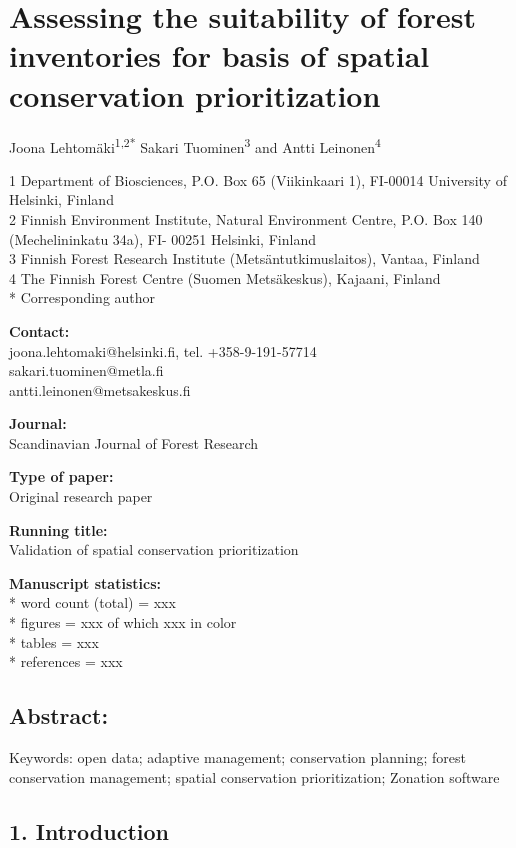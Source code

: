 \documentclass[]{article}
\begin{document}
\section{Assessing the suitability of forest inventories for basis of
spatial conservation prioritization}

Joona Lehtomäki\textsuperscript{1,2*} Sakari Tuominen\textsuperscript{3}
and Antti Leinonen\textsuperscript{4}

1 Department of Biosciences, P.O. Box 65 (Viikinkaari 1), FI-00014
University of Helsinki, Finland\\2 Finnish Environment Institute,
Natural Environment Centre, P.O. Box 140 (Mechelininkatu 34a), FI- 00251
Helsinki, Finland\\3 Finnish Forest Research Institute
(Metsäntutkimuslaitos), Vantaa, Finland\\4 The Finnish Forest Centre
(Suomen Metsäkeskus), Kajaani, Finland\\* Corresponding author

\textbf{Contact:}\\joona.lehtomaki@helsinki.fi, tel.
+358-9-191-57714\\sakari.tuominen@metla.fi\\antti.leinonen@metsakeskus.fi

\textbf{Journal:}\\Scandinavian Journal of Forest Research

\textbf{Type of paper:}\\Original research paper

\textbf{Running title:}\\Validation of spatial conservation
prioritization

\textbf{Manuscript statistics:}\\* word count (total) = xxx\\* figures =
xxx of which xxx in color\\* tables = xxx\\* references = xxx

\subsection{Abstract:}

Keywords: open data; adaptive management; conservation planning; forest
conservation management; spatial conservation prioritization; Zonation
software

\subsection{1. Introduction}
\end{document}
